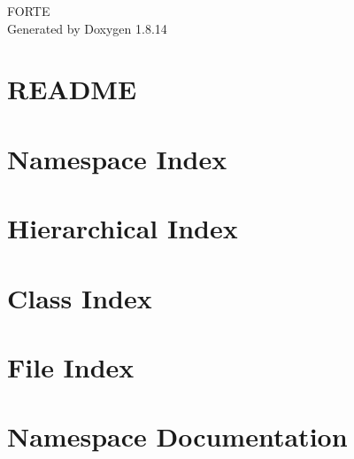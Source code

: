 \documentclass[twoside]{book}
\newcommand{\+}{\discretionary{\mbox{\scriptsize$\hookleftarrow$}}{}{}}
\newcommand{\clearemptydoublepage}{%
  \newpage{\pagestyle{empty}\cleardoublepage}%
}
\begin{document}
\hypersetup{pageanchor=false,
             bookmarksnumbered=true,
             pdfencoding=unicode
            }
\begin{titlepage}
\vspace*{7cm}
\begin{center}%
{\Large F\+O\+R\+TE }\\
\vspace*{1cm}
{\large Generated by Doxygen 1.8.14}\\
\end{center}
\end{titlepage}
\clearemptydoublepage
{}
\tableofcontents
\clearemptydoublepage
{}
\hypersetup{pageanchor=true}

\chapter{R\+E\+A\+D\+ME}
\label{md___users_fevange__source_forte_src_base_classes__r_e_a_d_m_e}

\chapter{Namespace Index}

\chapter{Hierarchical Index}

\chapter{Class Index}

\chapter{File Index}

\chapter{Namespace Documentation}




\end{document}
